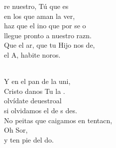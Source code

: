 \begin{cancion}%
	re nuestro, Tú que es \\
	en los que aman la ver,\\
	haz que el ino que por  se o\\
	llegue pronto a nuestro razn.\\
	Que el ar, que tu Hijo nos de, \\
	el A, habite noros.\\\jump\\
	\begin{chorus}%
	Y en el pan de la uni,\\
	Cristo danos Tu la .\\
	olvídate deuestroal\\
	si olvidamos el de s des. \\
	No peitas que caigamos en tentacn, \\
	Oh Sor,\\
	y ten pie del do.\\
	\end{chorus}%
	\jump\\
\end{cancion}%
